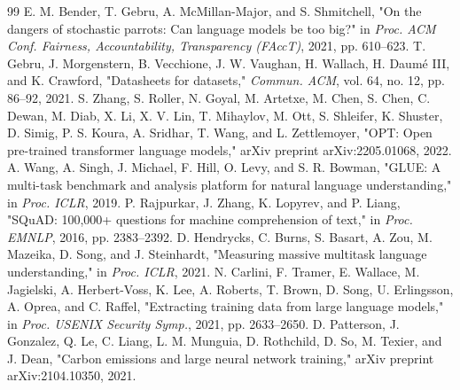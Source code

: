 \documentclass[journal]{IEEEtran}
\begin{document}
\begin{thebibliography}{99}
E. M. Bender, T. Gebru, A. McMillan-Major, and S. Shmitchell, "On the dangers of stochastic parrots: Can language models be too big?" in \textit{Proc. ACM Conf. Fairness, Accountability, Transparency (FAccT)}, 2021, pp. 610–623.
T. Gebru, J. Morgenstern, B. Vecchione, J. W. Vaughan, H. Wallach, H. Daumé III, and K. Crawford, "Datasheets for datasets," \textit{Commun. ACM}, vol. 64, no. 12, pp. 86–92, 2021.
S. Zhang, S. Roller, N. Goyal, M. Artetxe, M. Chen, S. Chen, C. Dewan, M. Diab, X. Li, X. V. Lin, T. Mihaylov, M. Ott, S. Shleifer, K. Shuster, D. Simig, P. S. Koura, A. Sridhar, T. Wang, and L. Zettlemoyer, "OPT: Open pre-trained transformer language models," arXiv preprint arXiv:2205.01068, 2022.
A. Wang, A. Singh, J. Michael, F. Hill, O. Levy, and S. R. Bowman, "GLUE: A multi-task benchmark and analysis platform for natural language understanding," in \textit{Proc. ICLR}, 2019.
P. Rajpurkar, J. Zhang, K. Lopyrev, and P. Liang, "SQuAD: 100,000+ questions for machine comprehension of text," in \textit{Proc. EMNLP}, 2016, pp. 2383–2392.
D. Hendrycks, C. Burns, S. Basart, A. Zou, M. Mazeika, D. Song, and J. Steinhardt, "Measuring massive multitask language understanding," in \textit{Proc. ICLR}, 2021.
N. Carlini, F. Tramer, E. Wallace, M. Jagielski, A. Herbert-Voss, K. Lee, A. Roberts, T. Brown, D. Song, U. Erlingsson, A. Oprea, and C. Raffel, "Extracting training data from large language models," in \textit{Proc. USENIX Security Symp.}, 2021, pp. 2633–2650.
D. Patterson, J. Gonzalez, Q. Le, C. Liang, L. M. Munguia, D. Rothchild, D. So, M. Texier, and J. Dean, "Carbon emissions and large neural network training," arXiv preprint arXiv:2104.10350, 2021.
\end{thebibliography}
\end{document}
